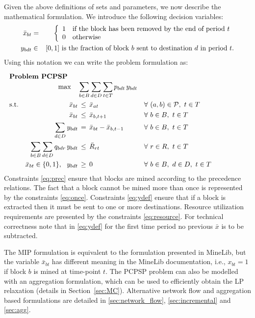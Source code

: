 \documentclass[authoryear,11pt,square,number,times,super,comma]{elsarticle}
\def\bx{\bar{x}}
\begin{document}
Given the above definitions of sets and parameters, we now describe the mathematical formulation. We introduce the following decision variables:
\begin{eqnarray*}
 \bar x_{bt} & = & \left \{ \begin{array}{ll}
                         1 & \hbox{if the  block has been removed by the end of period } t\\
                         0 & \hbox{otherwise}
                        \end{array} \right . \\
 y_{bdt} & \in & [0, 1] \hbox{ is the fraction of block } b \hbox{ sent to destination } d \hbox{ in period } t. 
\end{eqnarray*}
Using this notation we can write the problem formulation as:

\begin{alignat}{3}   %
  \noalign{\noindent\bf Problem PCPSP}
  &&\max\quad&\sum_{b\in B}\sum_{d\in D}\sum_{t\in T} p_{bdt}\,y_{bdt}   & \label{eq:obj} \\
  \text{s.t.} && \bx_{bt} &\,\leq\, \bx_{at}&&\forall\ (a,b)\in\mathcal{P},\ t\in T  \label{eq:prec}\\ 
  && \bx_{bt} &\,\leq\, \bx_{b,t+1} && \forall\ b\in B,\ t\in T \label{eq:once}\\
  &&\sum_{d\in D} y_{bdt} & \,=\, \bx_{bt}-\bx_{b,t-1}&&\forall\ b\in B,\ t\in T \label{eq:ydef}\\
  &&\sum_{b\in B}\sum_{d\in D} q_{bdr}\,y_{bdt}&\,\leq\, \bar R_{rt}&&\forall\
  r\in R,\ t\in T\label{eq:resource}\\
  &&\bx_{bt}\in\{0,1\},\ \ y_{bdt}&\,\geq\,0&&\forall\ b\in B,\ d\in D,\ t\in T \label{eq:vars}
\end{alignat}
Constraints \eqref{eq:prec} ensure that blocks are mined according to the precedence relations. 
The fact that a block cannot be mined more than once is represented by the constraints \eqref{eq:once}.
Constraints \eqref{eq:ydef} ensure that if a block is extracted then it must be sent to one or more destinations. 
Resource utilization requirements are presented by the constraints \eqref{eq:resource}.
For technical correctness note that in \eqref{eq:ydef} for the first time
period no previous $\bx$ is to be subtracted. 

The MIP formulation is equivalent to the formulation presented in MineLib, but the variable $\bx_{bt}$ has different meaning in the MineLib documentation, i.e., $x_{bt} = 1$ if block $b$ is mined at time-point $t$. The PCPSP problem can also be modelled with an aggregation formulation, which can be used to efficiently obtain the LP relaxation (details in Section~\ref{sec:MC}). Alternative network flow and aggregation based formulations are detailed in \ref{sec:network_flow}, \ref{sec:incremental} and \ref{sec:agg}.
\end{document}
